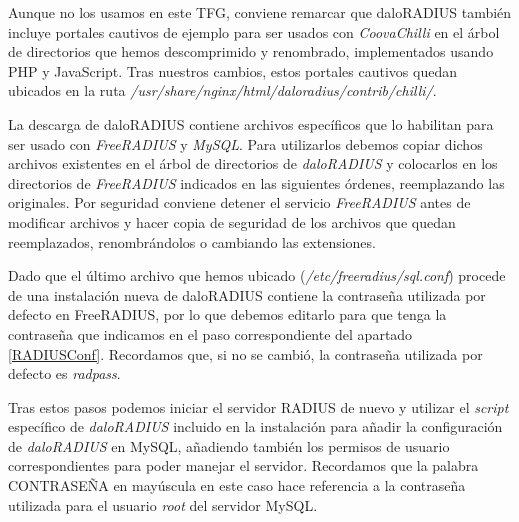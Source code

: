 Aunque no los usamos en este TFG, conviene remarcar que daloRADIUS también incluye portales cautivos de ejemplo para ser usados con \emph{CoovaChilli} en el árbol de directorios que hemos descomprimido y renombrado, implementados usando PHP y JavaScript. Tras nuestros cambios, estos portales cautivos quedan ubicados en la ruta \emph{/usr/share/nginx/html/daloradius/contrib/chilli/}.

La descarga de daloRADIUS contiene archivos específicos que lo habilitan para ser usado con \emph{FreeRADIUS} y \emph{MySQL}. Para utilizarlos debemos copiar dichos archivos existentes en el árbol de directorios de \emph{daloRADIUS} y colocarlos en los directorios de \emph{FreeRADIUS} indicados en las siguientes órdenes, reemplazando las originales. Por seguridad conviene detener el servicio \emph{FreeRADIUS} antes de modificar archivos y hacer copia de seguridad de los archivos que quedan reemplazados, renombrándolos o cambiando las extensiones.


Dado que el último archivo que hemos ubicado (\emph{/etc/freeradius/sql.conf}) procede de una instalación nueva de daloRADIUS contiene la contraseña utilizada por defecto en FreeRADIUS, por lo que debemos editarlo para que tenga la contraseña que indicamos en el paso correspondiente del apartado \ref{RADIUSConf}. Recordamos que, si no se cambió, la contraseña utilizada por defecto es \emph{radpass}.

Tras estos pasos podemos iniciar el servidor RADIUS de nuevo y utilizar el \emph{script} específico de \emph{daloRADIUS} incluido en la instalación para añadir la configuración de \emph{daloRADIUS} en MySQL, añadiendo también los permisos de usuario correspondientes para poder manejar el servidor. Recordamos que la palabra CONTRASEÑA en mayúscula en este caso hace referencia a la contraseña utilizada para el usuario \emph{root} del servidor MySQL.

